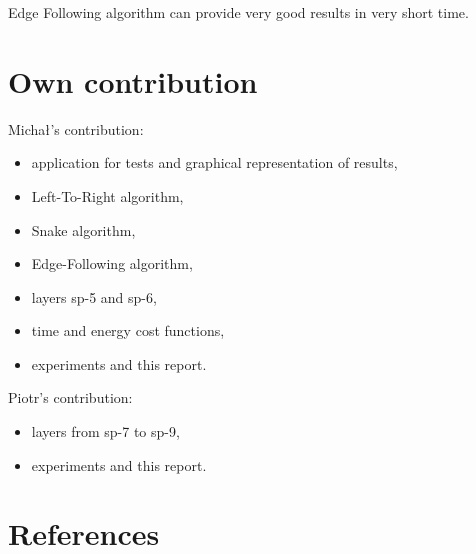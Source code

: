\documentclass[titlepage]{article}
\begin{document}
Edge Following algorithm can provide very good results in very short time.

\section{Own contribution}
Michał's contribution:
\begin{itemize}
\item application for tests and graphical representation of results,
\item Left-To-Right algorithm,
\item Snake algorithm,
\item Edge-Following algorithm,
\item layers sp-5 and sp-6,
\item time and energy cost functions,
\item experiments and this report.
\end{itemize}
Piotr's contribution:
\begin{itemize}
\item layers from sp-7 to sp-9,
\item experiments and this report. 
\end{itemize}

\section{References}
\end{document}
